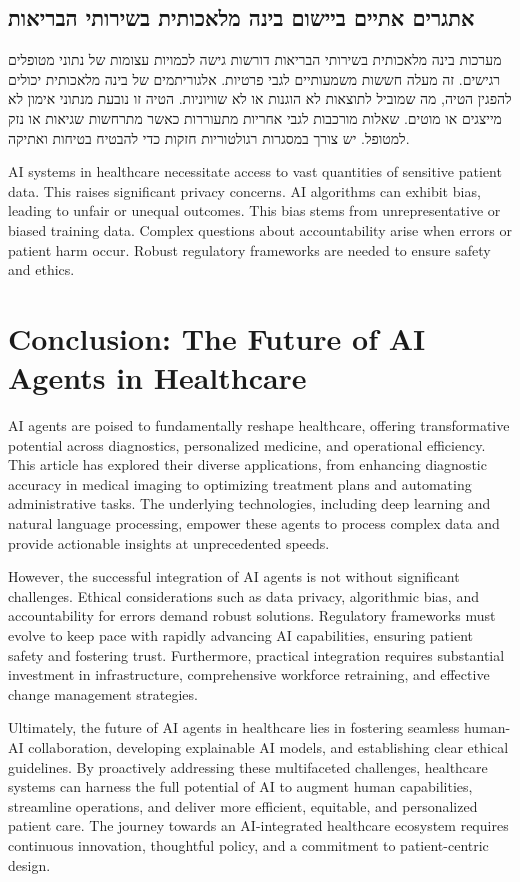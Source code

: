 \documentclass[12pt,a4paper]{article}
\newenvironment{hebrewblock}{%
  \begin{tcolorbox}[enhanced,breakable,parbox=false,
    colback=blue!4!white,colframe=blue!28!white,
    left=8pt,right=8pt,top=6pt,bottom=6pt,arc=2pt,boxrule=0.5pt]%
  \hebrewfont\begin{hebrew}%
}{%
  \end{hebrew}\end{tcolorbox}\vspace{3pt}%
}
\newenvironment{englishblock}{%
  \begin{tcolorbox}[enhanced,breakable,parbox=false,
    colback=gray!5!white,colframe=gray!28!white,
    left=8pt,right=8pt,top=6pt,bottom=6pt,arc=2pt,boxrule=0.5pt]%
  \normalfont\setLR%
}{%
  \end{tcolorbox}\vspace{3pt}%
}
\begin{document}
\subsection{\texthebrew{אתגרים אתיים ביישום בינה מלאכותית בשירותי הבריאות}}
\label{subsec:hebrew_ethical_challenges}
\begin{hebrewblock}
מערכות בינה מלאכותית בשירותי הבריאות דורשות גישה לכמויות עצומות של נתוני מטופלים רגישים. זה מעלה חששות משמעותיים לגבי פרטיות. אלגוריתמים של בינה מלאכותית יכולים להפגין הטיה, מה שמוביל לתוצאות לא הוגנות או לא שוויוניות. הטיה זו נובעת מנתוני אימון לא מייצגים או מוטים. שאלות מורכבות לגבי אחריות מתעוררות כאשר מתרחשות שגיאות או נזק למטופל. יש צורך במסגרות רגולטוריות חזקות כדי להבטיח בטיחות ואתיקה.
\end{hebrewblock}
\begin{englishblock}
AI systems in healthcare necessitate access to vast quantities of sensitive patient data. This raises significant privacy concerns. AI algorithms can exhibit bias, leading to unfair or unequal outcomes. This bias stems from unrepresentative or biased training data. Complex questions about accountability arise when errors or patient harm occur. Robust regulatory frameworks are needed to ensure safety and ethics.
\end{englishblock}

\section{Conclusion: The Future of AI Agents in Healthcare}
\label{sec:conclusion}
AI agents are poised to fundamentally reshape healthcare, offering transformative potential across diagnostics, personalized medicine, and operational efficiency. This article has explored their diverse applications, from enhancing diagnostic accuracy in medical imaging to optimizing treatment plans and automating administrative tasks. The underlying technologies, including deep learning and natural language processing, empower these agents to process complex data and provide actionable insights at unprecedented speeds.

However, the successful integration of AI agents is not without significant challenges. Ethical considerations such as data privacy, algorithmic bias, and accountability for errors demand robust solutions. Regulatory frameworks must evolve to keep pace with rapidly advancing AI capabilities, ensuring patient safety and fostering trust. Furthermore, practical integration requires substantial investment in infrastructure, comprehensive workforce retraining, and effective change management strategies.

Ultimately, the future of AI agents in healthcare lies in fostering seamless human-AI collaboration, developing explainable AI models, and establishing clear ethical guidelines. By proactively addressing these multifaceted challenges, healthcare systems can harness the full potential of AI to augment human capabilities, streamline operations, and deliver more efficient, equitable, and personalized patient care. The journey towards an AI-integrated healthcare ecosystem requires continuous innovation, thoughtful policy, and a commitment to patient-centric design.

\printbibliography[heading=bibintoc]
\end{document}

